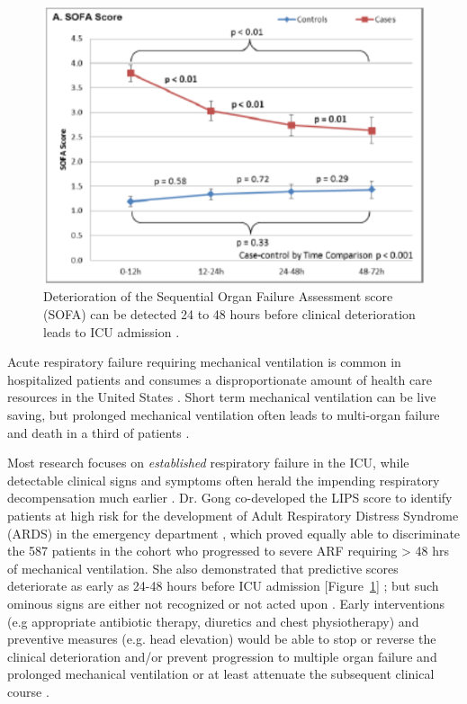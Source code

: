 \documentclass[11pt,notitlepage]{article}
\begin{document}
\begin{figure}
 \vspace{-70pt}
 \includegraphics[scale=0.7]{Figures/SOFA_fig.png}
  \vspace{-30pt}
  \caption{\footnotesize Deterioration of the Sequential Organ Failure Assessment score (SOFA) can be detected 24 to 48 hours before clinical deterioration leads to ICU admission \cite{Yu_24970344}.}
    \label{fig:SOFA_fig}
 \vspace{-20pt}
\end{figure}

Acute respiratory failure requiring mechanical ventilation is common in hospitalized patients and consumes a disproportionate amount of health care resources in the United States \cite{Wunsch_20639743}. Short term mechanical ventilation can be live saving, but prolonged mechanical ventilation often leads to multi-organ failure and death in a third of patients \cite{Wunsch_20639743, Ranieri_10872010}.

Most research focuses on \textit{established} respiratory failure in the ICU, while detectable clinical signs and symptoms often herald the impending respiratory decompensation much earlier \cite{Rohde_23401431}. Dr. Gong co-developed the LIPS score to identify patients at high risk for the development of Adult Respiratory Distress Syndrome (ARDS) in the emergency department \cite{Herridge_12594312}, which proved equally able to discriminate the 587 patients in the cohort who progressed to severe ARF requiring > 48 hrs of mechanical ventilation. She also demonstrated that predictive scores deteriorate as early as 24-48 hours before ICU admission  [Figure~\ref{fig:SOFA_fig}] \cite{Yu_24970344}; but such ominous signs are either not recognized or not acted upon \cite{Hillman_12415452,McQuillan_9632403}. Early interventions (e.g appropriate antibiotic therapy, diuretics and chest physiotherapy) and preventive measures (e.g. head elevation) would be able to stop or reverse the clinical deterioration and/or prevent progression to multiple organ failure and prolonged mechanical ventilation or at least attenuate the subsequent clinical course \cite{Naeem_16150531,Rivers_11794169,Rivers_12594312,Mitchell_20378235}. 
\end{document}
